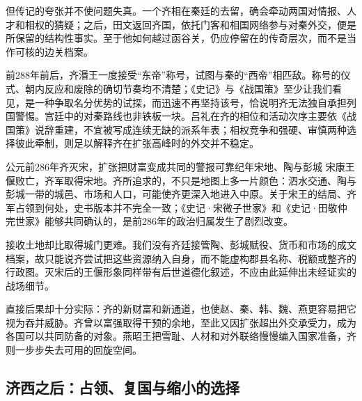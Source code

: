 但传记的夸张并不使问题失真。一个齐相在秦廷的去留，确会牵动两国对情报、人才和相权的猜疑；之后，田文返回齐国，依托门客和相国网络参与对秦外交，便是所保留的结构性事实。至于他如何越过函谷关，仍应停留在的传奇层次，而不是当作可核的边关档案。

前288年前后，齐湣王一度接受“东帝”称号，试图与秦的“西帝”相匹敌。称号的仪式、朝内反应和废除的确切节奏均不清楚；《史记》与《战国策》至少让我们看见，是一种争取名分优势的试探，而迅速不再坚持该号，恰说明齐无法独自承担列国警惕。宫廷中的对秦路线也非铁板一块。吕礼在齐的相位和活动次序主要依《战国策》说辞重建，不宜被写成连续无缺的派系年表；相权竞争和强硬、审慎两种选择彼此牵制，则足以解释齐在扩张高峰时的外交并不稳定。

\begin{event}{公元前286年}{齐灭宋，扩张把财富变成共同的警报}{可靠纪年}{宋地、陶与彭城}
宋康王偃败亡，齐军取得宋地。齐所追求的，不只是地图上多一片颜色：泗水交通、陶与彭城一带的城邑、市场和人口，可能使齐更深入地进入中原。关于宋王的结局、齐军占领到何处，史书版本并不完全一致；《史记·宋微子世家》和《史记·田敬仲完世家》能够共同确认的，是前286年的政治归属发生了剧烈改变。

接收土地却比取得城门更难。我们没有齐廷接管陶、彭城赋役、货币和市场的成文档案，故只能说齐尝试把这些资源纳入自身，而不能虚构郡县名称、税额或整齐的行政图。灭宋后的王偃形象同样带有后世道德化叙述，不应由此延伸出未经证实的战场细节。

直接后果却十分实际：齐的新财富和新通道，也使赵、秦、韩、魏、燕更容易把它视为吞并威胁。齐曾以富强取得干预的余地，至此又因扩张超出外交承受力，成为各国可以共同防备的对象。燕昭王把雪耻、人材和对外联络慢慢编入国家准备，齐则一步步失去可用的回旋空间。
\end{event}

\subsection{济西之后：占领、复国与缩小的选择}

